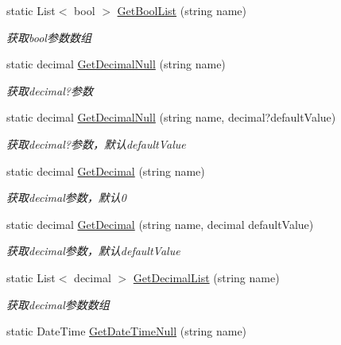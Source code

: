 \begin{DoxyCompactItemize}
static List$<$ bool $>$ \hyperlink{class_x_c_l_net_tools_1_1_string_hander_1_1_form_helper_a134c9765f209b53268358ab4f2bf2821}{Get\+Bool\+List} (string name)
\begin{DoxyCompactList}\small\item\em 获取bool参数数组 \end{DoxyCompactList}\item 
static decimal \hyperlink{class_x_c_l_net_tools_1_1_string_hander_1_1_form_helper_a67ca5ec273b5b94c20a6fd79b0e3c3f7}{Get\+Decimal\+Null} (string name)
\begin{DoxyCompactList}\small\item\em 获取decimal?参数 \end{DoxyCompactList}\item 
static decimal \hyperlink{class_x_c_l_net_tools_1_1_string_hander_1_1_form_helper_ac94db6da5663acdc23ce3bc79ec99c12}{Get\+Decimal\+Null} (string name, decimal?default\+Value)
\begin{DoxyCompactList}\small\item\em 获取decimal?参数，默认default\+Value \end{DoxyCompactList}\item 
static decimal \hyperlink{class_x_c_l_net_tools_1_1_string_hander_1_1_form_helper_a61ef0cfc5b32dadd67700c5f307850d3}{Get\+Decimal} (string name)
\begin{DoxyCompactList}\small\item\em 获取decimal参数，默认0 \end{DoxyCompactList}\item 
static decimal \hyperlink{class_x_c_l_net_tools_1_1_string_hander_1_1_form_helper_ab147eaeb86996c9c03099a5bd6d6ac6d}{Get\+Decimal} (string name, decimal default\+Value)
\begin{DoxyCompactList}\small\item\em 获取decimal参数，默认default\+Value \end{DoxyCompactList}\item 
static List$<$ decimal $>$ \hyperlink{class_x_c_l_net_tools_1_1_string_hander_1_1_form_helper_ab3f5108e85eb8bf10ab5317e77bc1f2c}{Get\+Decimal\+List} (string name)
\begin{DoxyCompactList}\small\item\em 获取decimal参数数组 \end{DoxyCompactList}\item 
static Date\+Time \hyperlink{class_x_c_l_net_tools_1_1_string_hander_1_1_form_helper_a420660ded9f4960446f03cede154198b}{Get\+Date\+Time\+Null} (string name)

\end{DoxyCompactItemize}
